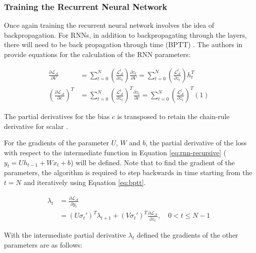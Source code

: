 \subsubsection{Training the Recurrent Neural Network}
Once again training the recurrent neural network involves the idea of backpropagation. For RNNs, in addition to backpropagating through the layers, there will need to be back propagation through time (BPTT) \cite{salemRecurrentNeuralNetworks2022}. The authors in \cite{salemRecurrentNeuralNetworks2022} provide equations for the calculation of the RNN parameters:

\begin{equation}
    \begin{split}
        \frac{\partial \mathcal{L}_\mathcal{A}}{\partial V} &= \sum_{t=0}^{N}\left(\frac{\mathcal{L}_\mathcal{A}^t}{\partial z_t}\right) \frac{\partial z_t}{\partial V} = \sum_{t=0}^{N}\left(\frac{\mathcal{L}_\mathcal{A}^t}{\partial z_t}\right) h_t^T \\
        \left(\frac{\partial \mathcal{L}_\mathcal{A}}{\partial c}\right)^T &= \sum_{t=0}^{N}\left(\frac{\mathcal{L}_\mathcal{A}^t}{\partial z_t}\right)^T \frac{\partial z_t}{\partial c} = \sum_{t=0}^{N}\left(\frac{\mathcal{L}_\mathcal{A}^t}{\partial z_t}\right)^T (1)
    \end{split}
\end{equation}

The partial derivatives for the bias $c$ is transposed to retain the chain-rule derivative for scalar \cite{salemRecurrentNeuralNetworks2022}. 

For the gradients of the parameter $U$, $W$ and $b$, the partial derivative of the loss with respect to the intermediate function in Equation \ref{eq:rnn-recursive} ($y_t = Uh_{t-1} + Wx_t+b$) will be defined. Note that to find the gradient of the parameters, the algorithm is required to step backwards in time starting from the $t=N$ and iteratively using Equation \ref{eq:bptt}.

\begin{equation}
    \label{eq:bptt}
    \begin{split}
    \lambda_t &= \frac{\partial \mathcal{L}_\mathcal{A}}{\partial y_t}  \\
    &= (U\sigma_t')^T \lambda_{t+1} + (V \sigma_t')^T  \frac{\partial \mathcal{L}_\mathcal{A} }{\partial z_t}, \quad 0 < t \leq N - 1
    \end{split}
\end{equation}

With the intermediate partial derivative $\lambda_t$ defined the gradients of the other parameters are as follows:

